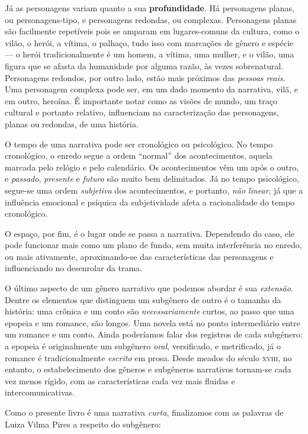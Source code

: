 \documentclass[11pt]{extarticle}
\begin{document}
Já as personagens variam quanto a sua \textbf{profundidade}. Há personagens planas, ou
personagens-tipo, e personagens redondas, ou complexas. Personagens planas
são facilmente repetíveis pois se amparam em lugares-comuns da cultura, como
o vilão, o herói, a vítima, o palhaço, tudo isso com marcações de gênero e espécie ---
o herói tradicionalmente é um homem, a vítima, uma mulher, e o vilão, uma figura que 
se afasta da humanidade por alguma razão, às vezes sobrenatural. 
Personagens redondos, por outro lado, estão mais próximos das \textit{pessoas reais}.
Uma personagem complexa pode ser, em um dado momento da narrativa, vilã, e em 
outro, heroína. É importante notar como as visões de mundo, um traço cultural e 
portanto relativo, influenciam na caracterização das personagens, planas 
ou redondas, de uma história.

O tempo de uma narrativa pode ser cronológico ou psicológico.
No tempo cronológico, o enredo segue a ordem ``normal'' dos acontecimentos,
aquela marcada pelo relógio e pelo calendário. Os acontecimentos vêm um após o 
outro, e \textit{passado}, \textit{presente} e \textit{futuro} são muito bem delimitados.
Já no tempo psicológico, segue-se uma ordem \textit{subjetiva} dos acontecimentos, 
e portanto, \textit{não linear}, já que a influência emocional e psíquica 
da subjetividade afeta a racionalidade do tempo cronológico. 

O espaço, por fim, é o lugar onde se passa a narrativa. Dependendo do caso, 
ele pode funcionar mais como um plano de fundo, sem muita interferência
no enredo, ou mais ativamente, aproximando-se das características das personagens
e influenciando no desenrolar da trama. 

O último aspecto de um gênero narrativo que podemos abordar é sua 
\textit{extensão}. Dentre os elementos que distinguem um subgênero 
de outro é o tamanho da história: uma crônica e um conto são \textit{necessariamente}
curtos, ao passo que uma epopeia e um romance, são longos. Uma novela
está no ponto intermediário entre um romance e um conto.
Ainda poderíamos falar dos registros de cada subgênero: 
a epopeia é originalmente um subgênero \textit{oral}, versificado, e metrificado,
já o romance é tradicionalmente \textit{escrito} em prosa. 
Desde meados do século \textsc{xviii}, no entanto, o estabelecimento
dos gêneros e subgêneros narrativos tornam-se cada vez menos rígido,
com as características cada vez mais fluidas e intercomunicativas.

Como o presente livro é uma narrativa \textit{curta},
finalizamos com as palavras de Luiza Vilma Pires a respeito do
subgênero:
\end{document}
